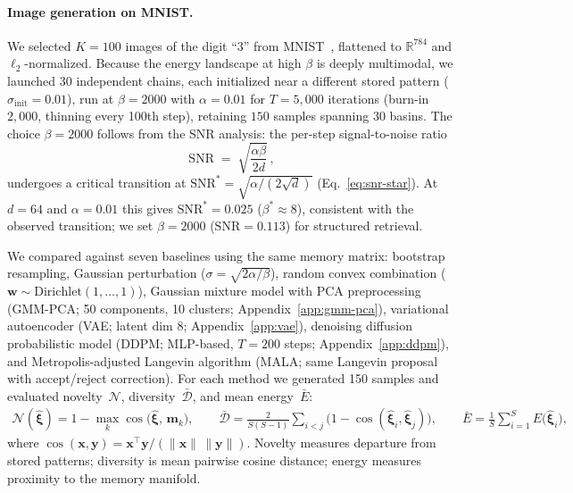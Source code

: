 \paragraph{Image generation on MNIST.}
We selected $K=100$ images of the digit ``3'' from MNIST~\cite{lecunGradientBasedLearningApplied1998}, flattened to $\mathbb{R}^{784}$ and $\ell_2$-normalized. Because the energy landscape at high $\beta$ is deeply multimodal, we launched 30 independent chains, each initialized near a different stored pattern ($\sigma_{\mathrm{init}}=0.01$), run at $\beta=2000$ with $\alpha=0.01$ for $T=5{,}000$ iterations (burn-in $2{,}000$, thinning every 100th step), retaining $150$ samples spanning 30 basins. The choice $\beta=2000$ follows from the SNR analysis: the per-step signal-to-noise ratio
\begin{equation}
\mathrm{SNR}
\;=\;\sqrt{\frac{\alpha\beta}{2d}}\,,
\label{eq:snr}
\end{equation}
undergoes a critical transition at $\mathrm{SNR}^{*}=\sqrt{\alpha/(2\sqrt{d})}$ (Eq.~\ref{eq:snr-star}). At $d{=}64$ and $\alpha{=}0.01$ this gives $\mathrm{SNR}^{*}=0.025$ ($\beta^{*}\approx 8$), consistent with the observed transition; we set $\beta=2000$ ($\mathrm{SNR}=0.113$) for structured retrieval.

We compared against seven baselines using the same memory matrix: bootstrap resampling, Gaussian perturbation ($\sigma=\sqrt{2\alpha/\beta}$), random convex combination ($\mathbf{w}\sim\mathrm{Dirichlet}(1,\dots,1)$), Gaussian mixture model with PCA preprocessing (GMM-PCA; 50 components, 10 clusters; Appendix~\ref{app:gmm-pca}), variational autoencoder (VAE; latent dim 8; Appendix~\ref{app:vae}), denoising diffusion probabilistic model (DDPM; MLP-based, $T{=}200$ steps; Appendix~\ref{app:ddpm}), and Metropolis-adjusted Langevin algorithm (MALA; same Langevin proposal with accept/reject correction). For each method we generated 150 samples and evaluated novelty~$\mathcal{N}$, diversity~$\bar{\mathcal{D}}$, and mean energy~$\bar{E}$:
\begin{align*}
\mathcal{N}(\hat{\boldsymbol{\xi}}) = 1 - \max_{k}\cos\!\bigl(\hat{\boldsymbol{\xi}},\,\mathbf{m}_{k}\bigr),\qquad
\bar{\mathcal{D}} = \frac{2}{S(S{-}1)}\!\sum_{i<j}\bigl(1-\cos(\hat{\boldsymbol{\xi}}_i,\hat{\boldsymbol{\xi}}_j)\bigr),\qquad
\bar{E} = \frac{1}{S}\sum_{i=1}^{S} E\!\bigl(\hat{\boldsymbol{\xi}}_i\bigr),
\end{align*}
where $\cos(\mathbf{x},\mathbf{y})=\mathbf{x}^{\top}\mathbf{y}/(\lVert\mathbf{x}\rVert\,\lVert\mathbf{y}\rVert)$. Novelty measures departure from stored patterns; diversity is mean pairwise cosine distance; energy measures proximity to the memory manifold.

